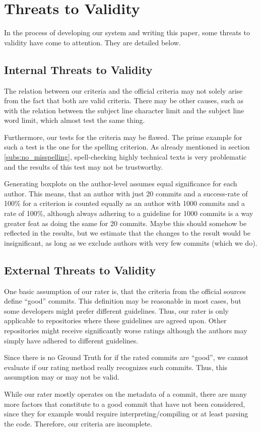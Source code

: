 \section{Threats to Validity}
\label{sec:threats-to-validity}

In the process of developing our system and writing this paper, some threats to validity have come to attention. They are detailed below.

\subsection{Internal Threats to Validity}
\label{sec:internal-threats}

The relation between our criteria and the official criteria may not solely arise from the fact that both are valid criteria. There may be other causes, such as with the relation between the subject line character limit and the subject line word limit, which almost test the same thing.

Furthermore, our tests for the criteria may be flawed. The prime example for such a test is the one for the spelling criterion. As already mentioned in section \ref{subs:no_misspelling}, spell-checking highly technical texts is very problematic and the results of this test may not be trustworthy.

Generating boxplots on the author-level assumes equal significance for each author. This means, that an author with just 20 commits and a success-rate of 100\% for a criterion is counted equally as an author with 1000 commits and a rate of 100\%, although always adhering to a guideline for 1000 commits is a way greater feat as doing the same for 20 commits. Maybe this should somehow be reflected in the results, but we estimate that the changes to the result would be insignificant, as long as we exclude authors with very few commits (which we do).

\subsection{External Threats to Validity}
\label{sec:external-threats}

One basic assumption of our rater is, that the criteria from the official sources define ``good'' commits. This definition may be reasonable in most cases, but some developers might prefer different guidelines. Thus, our rater is only applicable to repositories where these guidelines are agreed upon. Other repositories might receive significantly worse ratings although the authors may simply have adhered to different guidelines.

Since there is no Ground Truth for if the rated commits are ``good'', we cannot evaluate if our rating method really recognizes such commits. Thus, this assumption may or may not be valid.

While our rater mostly operates on the metadata of a commit, there are many more factors that constitute to a good commit that have not been considered, since they for example would require interpreting/compiling or at least parsing the code. Therefore, our criteria are incomplete.
